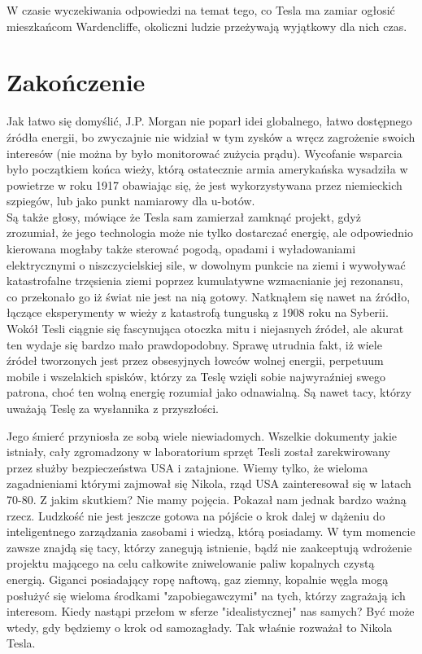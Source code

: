 \documentclass{article}
\begin{document}
\begin{large}
W czasie wyczekiwania odpowiedzi na temat tego, co Tesla ma zamiar ogłosić mieszkańcom Wardencliffe, okoliczni ludzie przeżywają wyjątkowy dla nich czas.

\newpage
\section{Zakończenie}

Jak łatwo się domyślić, J.P. Morgan nie poparł idei globalnego, łatwo dostępnego źródła energii, bo zwyczajnie nie widział w tym zysków a wręcz zagrożenie swoich interesów (nie można by było monitorować zużycia prądu). Wycofanie wsparcia było początkiem końca wieży, którą ostatecznie armia amerykańska wysadziła w powietrze w roku 1917 obawiając się, że jest wykorzystywana przez niemieckich szpiegów, lub jako punkt namiarowy dla u-botów.
\\
\indent Są także głosy, mówiące że Tesla sam zamierzał zamknąć projekt, gdyż zrozumiał, że jego technologia może nie tylko dostarczać energię, ale odpowiednio kierowana mogłaby także sterować pogodą, opadami i wyładowaniami elektrycznymi o niszczycielskiej sile, w dowolnym punkcie na ziemi i wywoływać katastrofalne trzęsienia ziemi poprzez kumulatywne wzmacnianie jej rezonansu, co przekonało go iż świat nie jest na nią gotowy. Natknąłem się nawet na źródło, łączące eksperymenty w wieży z katastrofą tunguską z 1908 roku na Syberii. Wokół Tesli ciągnie się fascynująca otoczka mitu i niejasnych źródeł, ale akurat ten wydaje się bardzo mało prawdopodobny. Sprawę utrudnia fakt, iż wiele źródeł tworzonych jest przez obsesyjnych łowców wolnej energii, perpetuum mobile i wszelakich spisków, którzy za Teslę wzięli sobie najwyraźniej swego patrona, choć ten wolną energię rozumiał jako odnawialną. Są nawet tacy, którzy uważają Teslę za wysłannika z przyszłości.

\indent Jego śmierć przyniosła ze sobą wiele niewiadomych. Wszelkie dokumenty jakie istniały, cały zgromadzony w laboratorium sprzęt Tesli został zarekwirowany przez służby bezpieczeństwa USA i zatajnione. Wiemy tylko, że wieloma zagadnieniami którymi zajmował się Nikola, rząd USA zainteresował się w latach 70-80. Z jakim skutkiem? Nie mamy pojęcia. Pokazał nam jednak bardzo ważną rzecz. Ludzkość nie jest jeszcze gotowa na pójście o krok dalej w dążeniu do inteligentnego zarządzania zasobami i wiedzą, którą posiadamy. W tym momencie zawsze znajdą się tacy, którzy zanegują istnienie, bądź nie zaakceptują wdrożenie projektu mającego na celu całkowite zniwelowanie paliw kopalnych czystą energią. Giganci posiadający ropę naftową, gaz ziemny, kopalnie węgla mogą posłużyć się wieloma środkami "zapobiegawczymi" na tych, którzy zagrażają ich interesom. Kiedy nastąpi przełom w sferze "idealistycznej" nas samych? Być może wtedy, gdy będziemy o krok od samozagłady. Tak właśnie rozważał to Nikola Tesla.


\end{large}
\end{document}
